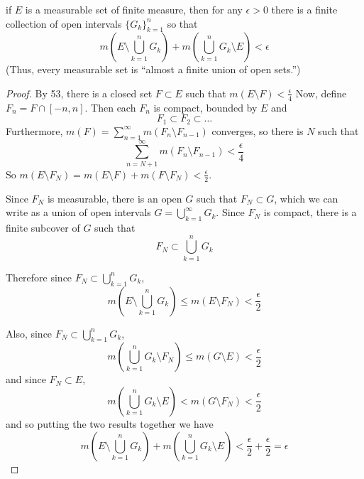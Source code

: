 \begin{pblm}\label{p:finitemeasurable}%
	if $E$ is a measurable set of finite measure, then for any $\epsilon > 0$ 
	there is a finite collection of open intervals $\{G_k\}_{k=1}^n$ so that 
	\begin{equation*}
		m\left(E\setminus\bigcup\limits_{k=1}^nG_k\right) + 
		m\left(\bigcup\limits_{k=1}^nG_k\setminus E\right) < \epsilon
	\end{equation*}
	(Thus, every measurable set is ``almost a finite union of open sets.'')
\begin{proof}
	By 53, there is a closed set $F \subset E$ such that 
	$m(E \setminus F) < \frac{\epsilon}{4}$
	Now, define $F_n = F \cap [-n,n]$. Then each $F_n$ is compact, bounded by $E$ 
	and 
	\begin{equation*}
		F_1 \subset F_2 \subset \dots
	\end{equation*}
	Furthermore, $m(F) = \sum\limits_{n=1}^\infty m(F_n \setminus F_{n-1})$ converges, 
	so there is $N$ such that 
	\begin{equation*}
		\sum\limits_{n=N+1}^\infty m(F_n\setminus F_{n-1}) < \frac{\epsilon}{4}
	\end{equation*}
	So $m(E \setminus F_N) = m(E \setminus F) + m(F \setminus F_N) < \frac{\epsilon}{2}$. 

	Since $F_N$ is measurable, there is an open $G$ such that $F_N \subset G$, which 
	we can write as a union of open intervals $G = \bigcup\limits_{k=1}^\infty G_k$. 
	Since $F_N$ is compact, there is a finite subcover of $G$ such that 
	\begin{equation*}
		F_N \subset \bigcup\limits_{k=1}^nG_k
	\end{equation*}

	Therefore since $F_N \subset \bigcup\limits_{k=1}^nG_k$, 
	\begin{equation*}
		m\left(E \setminus \bigcup\limits_{k=1}^nG_k\right) \le m(E \setminus F_N) < \frac{\epsilon}{2}
	\end{equation*}

	Also, since $F_N \subset \bigcup\limits_{k=1}^nG_k$, 
	\begin{equation*}
		m\left(\bigcup\limits_{k=1}^nG_k\setminus F_N\right) \le 
		m\left(G\setminus E\right) < \frac{\epsilon}{2}
	\end{equation*}
	and since $F_N \subset E$, 
	\begin{equation*}
		m\left(\bigcup\limits_{k=1}^n G_k \setminus E\right) < 
		m\left(G\setminus F_N\right) < \frac{\epsilon}{2}
	\end{equation*}
	and so putting the two results together we have 
	\begin{equation*}
		m\left(E\setminus\bigcup\limits_{k=1}^nG_k\right) + 
		m\left(\bigcup\limits_{k=1}^nG_k\setminus E\right) < 
		\frac{\epsilon}{2}+\frac{\epsilon}{2}=\epsilon
	\end{equation*}
\end{proof}
\end{pblm}

